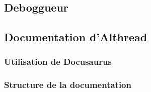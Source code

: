 \subsection{Deboggueur}
\subsection{Documentation d'Althread}
\subsubsection{Utilisation de Docusaurus}
\subsubsection{Structure de la documentation}